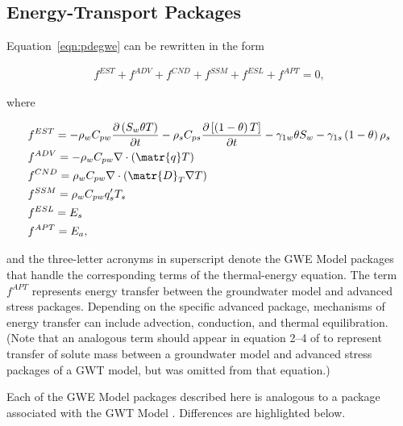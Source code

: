 \subsection{Energy-Transport Packages} \label{sec:packages}

\noindent Equation~\ref{eqn:pdegwe} can be rewritten in the form

\begin{equation}
\label{eqn:pdegwefterms}
\begin{aligned}
f^{EST} + f^{ADV} + f^{CND} + f^{SSM} + f^{ESL} + f^{APT} = 0,
\end{aligned}
\end{equation}

\noindent where

\begin{equation}
\label{eqn:fterms}
\begin{aligned}
& f^{EST} = - \rho_w C_{pw} \frac {\partial \left ( S_w \theta T \right )}{\partial t}
- \rho_s C_{ps} \frac {\partial \left [ \left (1 - \theta \right ) T \right ]}{\partial t}
- \gamma_{1w} \theta S_w - \gamma_{1s} \left (1 - \theta \right ) \rho_s \\
& f^{ADV} = - \rho_w C_{pw} \nabla \cdot \left ( \matr{q} T  \right ) \\
& f^{CND} =  \rho_w C_{pw} \nabla \cdot \left ( \matr{D}_T \nabla T \right ) \\
& f^{SSM} = \rho_w C_{pw} q'_s T_s \\
& f^{ESL} = E_s \\
& f^{APT} = E_a,
\end{aligned}
\end{equation}

\noindent and the three-letter acronyms in superscript denote the GWE Model packages that handle the corresponding terms of the thermal-energy equation. The term $ f^{APT}$ represents energy transfer between the groundwater model and advanced stress packages. Depending on the specific advanced package, mechanisms of energy transfer can include advection, conduction, and thermal equilibration. (Note that an analogous term should appear in equation 2--4 of \cite{modflow6gwt} to represent transfer of solute mass between a groundwater model and advanced stress packages of a GWT model, but was omitted from that equation.)

Each of the GWE Model packages described here is analogous to a package associated with the GWT Model \citep{modflow6gwt}. Differences are highlighted below.

